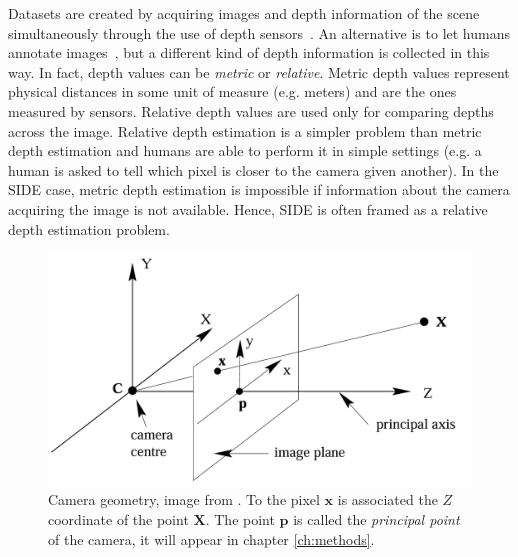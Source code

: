 Datasets are created by acquiring images and depth information of the scene simultaneously through the use of depth sensors~\cite{KITTI, NYUv2}.
An alternative is to let humans annotate images~\cite{DIW}, but a different kind of depth information is collected in this way.
In fact, depth values can be \textit{metric} or \textit{relative}.
Metric depth values represent physical distances in some unit of measure (e.g. meters) and are the ones measured by sensors.
Relative depth values are used only for comparing depths across the image.
Relative depth estimation is a simpler problem than metric depth estimation and humans are able to perform it in simple settings (e.g. a human is asked to tell which pixel is closer to the camera given another).
In the SIDE case, metric depth estimation is impossible if information about the camera acquiring the image is not available.
Hence, SIDE is often framed as a relative depth estimation problem.
\begin{figure}
    \centering
    \includegraphics[scale=0.3]{figs/coordinates}
    \caption{
        Camera geometry, image from \cite{multiview}.
        To the pixel $\mathbf{x}$ is associated the $Z$ coordinate of the point $\mathbf{X}$.
        The point $\mathbf{p}$ is called the \textit{principal point} of the camera, it will appear in chapter \ref{ch:methods}.
        \label{fig:coordinates}
    }
\end{figure}

